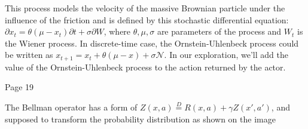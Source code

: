 This process models the velocity of the massive Brownian particle under the
influence of the friction and is defined by this stochastic differential
equation: \begin{math}\partial x_t=\theta(\mu-x_t)\partial t + \sigma\partial W\end{math},
where \begin{math}\theta, \mu, \sigma\end{math} are parameters of the process and \begin{math}W_t\end{math} is the
Wiener process. In discrete-time case, the Ornstein-Uhlenbeck process could be
written as \begin{math}x_{t+1}=x_t + \theta(\mu - x)+\sigma\mathcal{N} \end{math}. In our exploration, we’ll add the value of the
Ornstein-Uhlenbeck process to the action returned by the actor.


Page 19

The Bellman operator has a form of
\begin{math}Z(x, a)\stackrel{D}{=} R(x, a) + \gamma Z(x', a')\end{math}, and supposed to transform the probability distribution as shown on the image 

    

